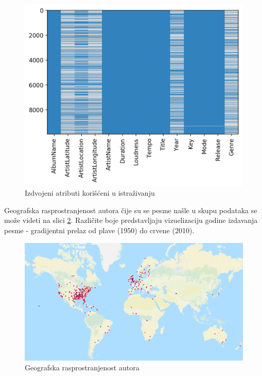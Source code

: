 \begin{figure}[H]
    \includegraphics[scale=0.8]{resources/after_processing.png}
    \caption{Izdvojeni atributi kori\v{s}\'c{}eni u istra\v{z}ivanju}
    \label{fig:after}
\end{figure}


Geografska rasprostranjenost autora \v{c}ije su se pesme na\v{s}le u skupu podataka se mo\v{z}e videti na slici \ref{fig:Geolokacija}. Razli\v{c}ite boje predstavljaju vizuelizaciju godine izdavanja pesme - gradijentni prelaz od plave (1950) do crvene (2010).

\begin{figure}[H]
    \centering
    \includegraphics[scale=0.45]{resources/Geolokacija.png}
    \caption{Geografska rasprostranjenost autora}
    \label{fig:Geolokacija}
\end{figure}

